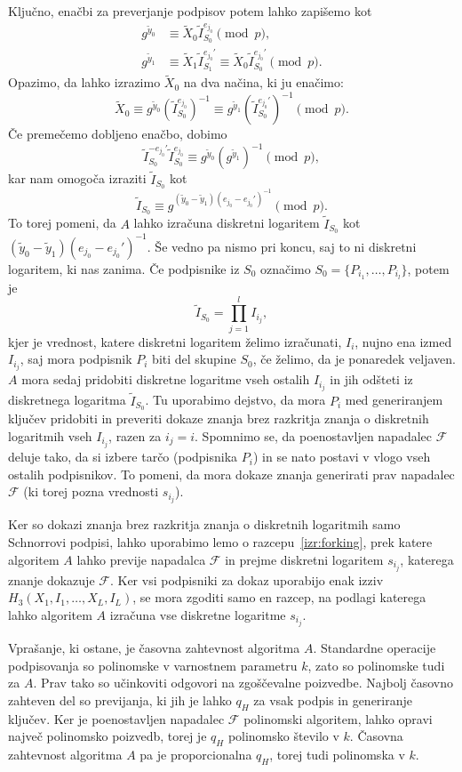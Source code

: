 \documentclass[isrm2, tisk]{fmfdelo}
\begin{document}
Ključno, enačbi za preverjanje podpisov potem lahko zapišemo kot
\begin{align*}
    g^{\tilde{y}_0} &\equiv \tilde{X}_0 \tilde{I}_{S_0}^{e_{j_0}} \pmod p, \\
    g^{\tilde{y}_1} &\equiv \tilde{X}_1 \tilde{I}_{S_1}^{e_{j_0}'}
        \equiv \tilde{X}_0 \tilde{I}_{S_0}^{e_{j_0}'} \pmod p.
\end{align*}
Opazimo, da lahko izrazimo $\tilde{X}_0$ na dva načina, ki ju enačimo:
$$
\tilde{X}_0 \equiv g^{\tilde{y}_0}(\tilde{I}_{S_0}^{e_{j_0}})^{-1}
    \equiv g^{\tilde{y}_1}(\tilde{I}_{S_0}^{e_{j_0}'})^{-1} \pmod p.
$$
Če premečemo dobljeno enačbo, dobimo
$$
\tilde{I}_{S_0}^{- e_{j_0}'} \tilde{I}_{S_0}^{e_{j_0}} \equiv g^{\tilde{y}_0}(g^{\tilde{y}_1})^{-1} \pmod p,
$$
kar nam omogoča izraziti $\tilde{I}_{S_0}$ kot
$$
\tilde{I}_{S_0} \equiv g^{(\tilde{y}_0 - \tilde{y}_1) (e_{j_0} - e_{j_0}')^{-1}} \pmod p.
$$
To torej pomeni, da $A$ lahko izračuna diskretni logaritem $\tilde{I}_{S_0}$ kot 
$(\tilde{y}_0 - \tilde{y}_1) (e_{j_0} - e_{j_0}')^{-1}$. Še vedno pa nismo pri koncu, saj to ni
diskretni logaritem, ki nas zanima. Če podpisnike iz $S_0$ označimo $S_0 = \{P_{i_1}, \dots, P_{i_l}\}$,
potem je 
$$
\tilde{I}_{S_0} = \prod_{j=1}^l I_{i_j},
$$
kjer je vrednost, katere diskretni logaritem želimo izračunati, $I_i$, nujno ena izmed $I_{i_j}$,
saj mora podpisnik $P_i$ biti del skupine $S_0$, če želimo, da je ponaredek veljaven. $A$ mora sedaj
pridobiti diskretne logaritme vseh ostalih $I_{i_j}$ in jih odšteti iz diskretnega logaritma
$\tilde{I}_{S_0}$. Tu uporabimo dejstvo, da mora $P_i$ med generiranjem ključev pridobiti in preveriti
dokaze znanja brez razkritja znanja o diskretnih logaritmih vseh $I_{i_j}$, razen za $i_j = i$.
Spomnimo se, da poenostavljen napadalec $\mathcal{F}$ deluje tako, da si izbere tarčo (podpisnika $P_i$)
in se nato postavi v vlogo vseh ostalih podpisnikov. To pomeni, da mora dokaze znanja generirati
prav napadalec $\mathcal{F}$ (ki torej pozna vrednosti $s_{i_j}$).

Ker so dokazi znanja brez razkritja znanja o diskretnih logaritmih samo Schnorrovi podpisi, lahko
uporabimo lemo o razcepu~\ref{izr:forking}, prek katere algoritem $A$ lahko previje napadalca
$\mathcal{F}$ in prejme diskretni logaritem $s_{i_j}$, katerega znanje dokazuje $\mathcal{F}$.
Ker vsi podpisniki za dokaz uporabijo enak izziv $H_3(X_1, I_1, \dots, X_L, I_L)$, se
mora zgoditi samo en razcep, na podlagi katerega lahko algoritem $A$ izračuna vse diskretne
logaritme $s_{i_j}$.

Vprašanje, ki ostane, je časovna zahtevnost algoritma $A$. Standardne operacije podpisovanja
so polinomske v varnostnem parametru $k$, zato so polinomske tudi za $A$. Prav tako so učinkoviti
odgovori na zgoščevalne poizvedbe. Najbolj časovno zahteven del so previjanja, ki jih je lahko $q_H$
za vsak podpis in generiranje ključev. Ker je poenostavljen napadalec $\mathcal{F}$ polinomski algoritem,
lahko opravi največ polinomsko poizvedb, torej je $q_H$ polinomsko število v $k$. Časovna zahtevnost
algoritma $A$ pa je proporcionalna $q_H$, torej tudi polinomska v $k$.
\end{document}
